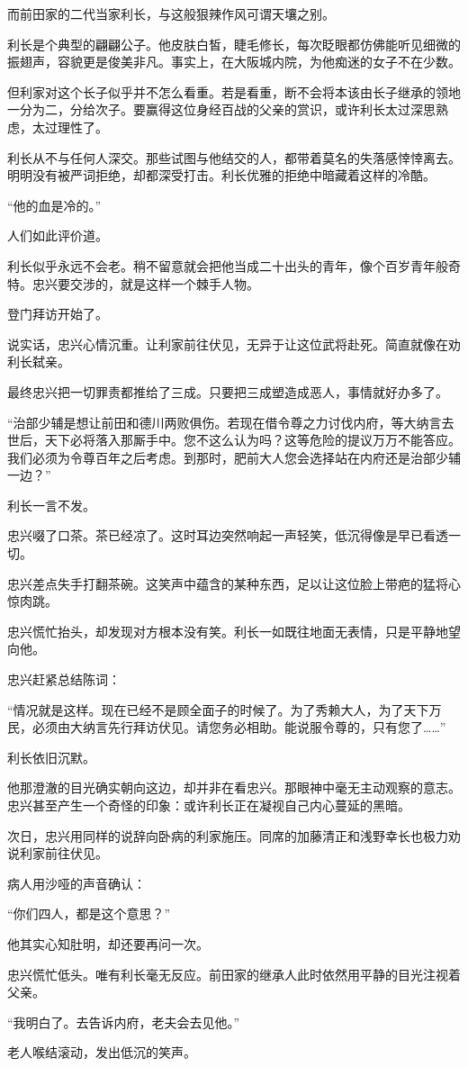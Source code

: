 \documentclass[
]{article}
\begin{document}
而前田家的二代当家利长，与这般狠辣作风可谓天壤之别。

利长是个典型的翩翩公子。他皮肤白皙，睫毛修长，每次眨眼都仿佛能听见细微的振翅声，容貌更是俊美非凡。事实上，在大阪城内院，为他痴迷的女子不在少数。

但利家对这个长子似乎并不怎么看重。若是看重，断不会将本该由长子继承的领地一分为二，分给次子。要赢得这位身经百战的父亲的赏识，或许利长太过深思熟虑，太过理性了。

利长从不与任何人深交。那些试图与他结交的人，都带着莫名的失落感悻悻离去。明明没有被严词拒绝，却都深受打击。利长优雅的拒绝中暗藏着这样的冷酷。

``他的血是冷的。''

人们如此评价道。

利长似乎永远不会老。稍不留意就会把他当成二十出头的青年，像个百岁青年般奇特。忠兴要交涉的，就是这样一个棘手人物。

登门拜访开始了。

说实话，忠兴心情沉重。让利家前往伏见，无异于让这位武将赴死。简直就像在劝利长弑亲。

最终忠兴把一切罪责都推给了三成。只要把三成塑造成恶人，事情就好办多了。

``治部少辅是想让前田和德川两败俱伤。若现在借令尊之力讨伐内府，等大纳言去世后，天下必将落入那厮手中。您不这么认为吗？这等危险的提议万万不能答应。我们必须为令尊百年之后考虑。到那时，肥前大人您会选择站在内府还是治部少辅一边？''

利长一言不发。

忠兴啜了口茶。茶已经凉了。这时耳边突然响起一声轻笑，低沉得像是早已看透一切。

忠兴差点失手打翻茶碗。这笑声中蕴含的某种东西，足以让这位脸上带疤的猛将心惊肉跳。

忠兴慌忙抬头，却发现对方根本没有笑。利长一如既往地面无表情，只是平静地望向他。

忠兴赶紧总结陈词：

``情况就是这样。现在已经不是顾全面子的时候了。为了秀赖大人，为了天下万民，必须由大纳言先行拜访伏见。请您务必相助。能说服令尊的，只有您了\ldots\ldots{}''

利长依旧沉默。

他那澄澈的目光确实朝向这边，却并非在看忠兴。那眼神中毫无主动观察的意志。忠兴甚至产生一个奇怪的印象：或许利长正在凝视自己内心蔓延的黑暗。

次日，忠兴用同样的说辞向卧病的利家施压。同席的加藤清正和浅野幸长也极力劝说利家前往伏见。

病人用沙哑的声音确认：

``你们四人，都是这个意思？''

他其实心知肚明，却还要再问一次。

忠兴慌忙低头。唯有利长毫无反应。前田家的继承人此时依然用平静的目光注视着父亲。

``我明白了。去告诉内府，老夫会去见他。''

老人喉结滚动，发出低沉的笑声。
\end{document}
